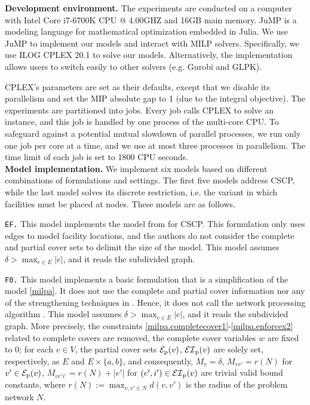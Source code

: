 \textbf{Development environment.}
The experiments are conducted on a computer with Intel Core i7-6700K  CPU @ 4.00GHZ and 16GB main memory. JuMP \cite{DunningHuchetteLubin2017} is a modeling language for mathematical optimization embedded in Julia. We use JuMP  to implement our models and interact with MILP solvers. Specifically, we use ILOG CPLEX 20.1 to solve our models. Alternatively, the implementation allows users to switch easily to other solvers (e.g. Gurobi and GLPK).

CPLEX's parameters are set as their defaults, except that we disable its parallelism and set  the MIP absolute gap to 1 (due to the integral objective). The experiments are partitioned into jobs. Every job calls CPLEX to solve an instance, and this job is handled by one process of the multi-core CPU. To safeguard
against a potential mutual slowdown of parallel processes, we run only one job per core at a
time, and we use at most three processes in parallelism.  The time limit of each job is set to 1800 CPU seconds.\\

\textbf{Model implementation.}
We implement six models based on different combinations of formulations and settings. The first five models address CSCP, while the last model solves its discrete restriction, i.e. the variant in which facilities must be placed at nodes. These models are as follows.

\texttt{EF.} This model implements the model from \cite{Hamacher20} for CSCP. This formulation only uses edges to model facility locations, and the authors do not consider the complete and partial cover sets to delimit the size of the model. This model assumes $\delta > \max_{e \in E}|e|$, and it reads the subdivided graph.

\texttt{F0.} This model implements a  basic formulation that is a simplification of the model \eqref{milpa}. It does not use the complete and partial cover information nor any of the strengthening techniques in . Hence, it does not call the network processing algorithm \ncalgo. This model assumes $\delta > \max_{e \in E}|e|$, and it reads the subdivided graph. More precisely, the constraints \eqref{milpa.completecover1}-\eqref{milpa.enforcex2} related to complete covers are removed, the complete cover variables $w$ are fixed to $0$; for each $v \in V$, the partial cover sets ${\mathcal E}_{\mathrm{p}}(v)$, ${\mathcal {EI}}_{\mathrm{p}}(v)$ are solely set, respectively, as $E$ and $E \times \{a,b\}$, and consequently, $M_{v} = \delta$, $M_{vv'} = r(N)$ for $v' \in {\mathcal E}_{\mathrm{p}}(v)$, $M_{ve'i'} = r(N) + |e'|$ for $(e',i') \in {\mathcal {EI}}_{\mathrm{p}}(v)$ are trivial valid bound constants, where $r(N):= \max_{v,v' \in N} d(v,v')$ is the radius of the problem network $N$.

